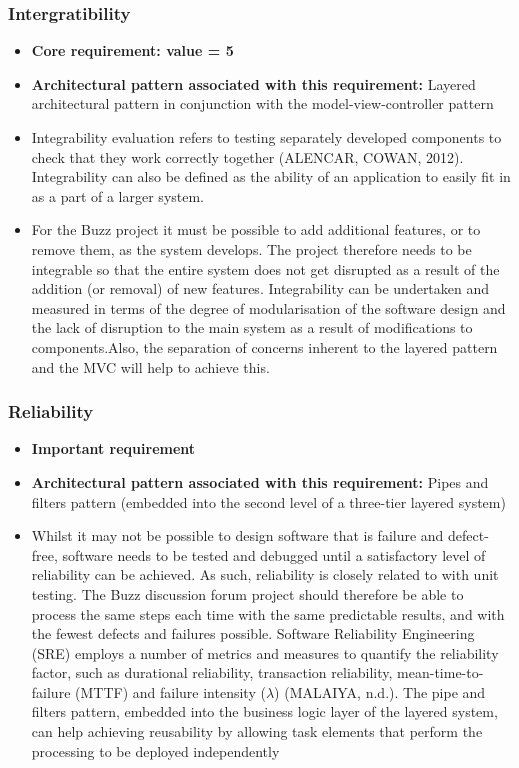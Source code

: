 \documentclass[a4paper]{article}
\begin{document}
\subsubsection{Intergratibility}
\begin{itemize}
	\item \textbf{Core requirement: value = 5}
	\item \textbf{Architectural pattern associated with this requirement:} Layered architectural pattern in conjunction with the model-view-controller pattern 
	\item Integrability evaluation refers to testing separately developed components to check that they work correctly together (ALENCAR, COWAN, 2012). Integrability can also be defined as the ability of an application to easily fit in as a part of a larger system. 
	\item For the Buzz project it must be possible to add additional features, or to remove them, as the system develops. The project therefore needs to be integrable so that the entire system does not get disrupted as a result of the addition (or removal) of new features. Integrability can be undertaken and measured in terms of the degree of modularisation
of the software design and the lack of disruption to the main system as a result of modifications to components.Also, the separation of concerns inherent to the layered pattern and the MVC will help to achieve this.
\end{itemize}



\subsubsection{Reliability}
\begin{itemize}
	\item \textbf{Important requirement}
	\item \textbf{Architectural pattern associated with this requirement:} Pipes and filters pattern (embedded into the second level of a three-tier layered system)
	\item Whilst it may not be possible to design software that is failure and defect-free, software needs to be tested and debugged until a satisfactory level of reliability can be achieved. As such, reliability is closely related to with unit testing. The Buzz discussion forum project should therefore be able to process the same steps each time with the same predictable results, and with the fewest defects and failures possible. Software Reliability Engineering (SRE) employs a number of metrics and measures to quantify the reliability factor, such as durational reliability, transaction reliability, mean-time-to-failure (MTTF) and failure intensity ($\lambda$) (MALAIYA, n.d.). The pipe and filters pattern, embedded into the business logic layer of the layered system, can help achieving reusability by allowing task elements that perform the processing to be deployed independently
\end{itemize}
\end{document}
